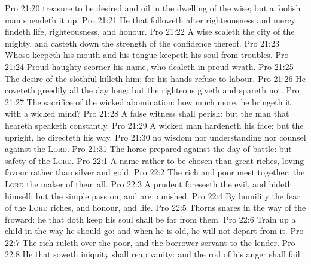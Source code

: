\vs Pro 21:20  treasure to be desired and oil in the dwelling of the wise; but a foolish man spendeth it up.
\vs Pro 21:21 He that followeth after righteousness and mercy findeth life, righteousness, and honour.
\vs Pro 21:22 A wise  scaleth the city of the mighty, and casteth down the strength of the confidence thereof.
\vs Pro 21:23 Whoso keepeth his mouth and his tongue keepeth his soul from troubles.
\vs Pro 21:24 Proud  haughty scorner  his name, who dealeth in proud wrath.
\vs Pro 21:25 The desire of the slothful killeth him; for his hands refuse to labour.
\vs Pro 21:26 He coveteth greedily all the day long: but the righteous giveth and spareth not.
\vs Pro 21:27 The sacrifice of the wicked  abomination: how much more,  he bringeth it with a wicked mind?
\vs Pro 21:28 A false witness shall perish: but the man that heareth speaketh constantly.
\vs Pro 21:29 A wicked man hardeneth his face: but  the upright, he directeth his way.
\vs Pro 21:30  no wisdom nor understanding nor counsel against the \textsc{Lord}.
\vs Pro 21:31 The horse  prepared against the day of battle: but safety  of the \textsc{Lord}.
\vs Pro 22:1 A  name  rather to be chosen than great riches,  loving favour rather than silver and gold.
\vs Pro 22:2 The rich and poor meet together: the \textsc{Lord}  the maker of them all.
\vs Pro 22:3 A prudent  foreseeth the evil, and hideth himself: but the simple pass on, and are punished.
\vs Pro 22:4 By humility  the fear of the \textsc{Lord}  riches, and honour, and life.
\vs Pro 22:5 Thorns  snares  in the way of the froward: he that doth keep his soul shall be far from them.
\vs Pro 22:6 Train up a child in the way he should go: and when he is old, he will not depart from it.
\vs Pro 22:7 The rich ruleth over the poor, and the borrower  servant to the lender.
\vs Pro 22:8 He that soweth iniquity shall reap vanity: and the rod of his anger shall fail.
